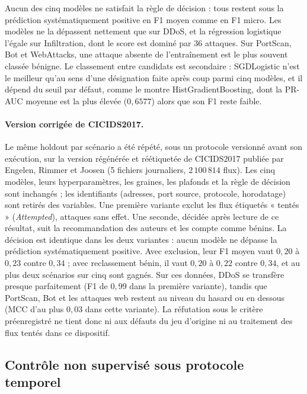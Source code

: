 Aucun des cinq modèles ne satisfait la règle de décision : tous restent sous la prédiction systématiquement positive en F1 moyen comme en F1 micro. Les modèles ne la dépassent nettement que sur DDoS, et la régression logistique l'égale sur Infiltration, dont le score est dominé par 36 attaques. Sur PortScan, Bot et WebAttacks, une attaque absente de l'entraînement est le plus souvent classée bénigne. Le classement entre candidats est secondaire : SGDLogistic n'est le meilleur qu'au sens d'une désignation faite après coup parmi cinq modèles, et il dépend du seuil par défaut, comme le montre HistGradientBoosting, dont la PR-AUC moyenne est la plus élevée ($0{,}6577$) alors que son F1 reste faible.

\paragraph{Version corrigée de CICIDS2017.}\label{sec:cicids-wtmc} Le même holdout par scénario a été répété, sous un protocole versionné avant son exécution, sur la version régénérée et réétiquetée de CICIDS2017 publiée par Engelen, Rimmer et Joosen (5 fichiers journaliers, $2\,100\,814$ flux). Les cinq modèles, leurs hyperparamètres, les graines, les plafonds et la règle de décision sont inchangés ; les identifiants (adresses, port source, protocole, horodatage) sont retirés des variables. Une première variante exclut les flux étiquetés « tentés » (\textit{Attempted}), attaques sans effet. Une seconde, décidée après lecture de ce résultat, suit la recommandation des auteurs et les compte comme bénins. La décision est identique dans les deux variantes : aucun modèle ne dépasse la prédiction systématiquement positive. Avec exclusion, leur F1 moyen vaut $0{,}20$ à $0{,}23$ contre $0{,}34$ ; avec reclassement bénin, il vaut $0{,}20$ à $0{,}22$ contre $0{,}34$, et au plus deux scénarios sur cinq sont gagnés. Sur ces données, DDoS se transfère presque parfaitement (F1 de $0{,}99$ dans la première variante), tandis que PortScan, Bot et les attaques web restent au niveau du hasard ou en dessous (MCC d'au plus $0{,}03$ dans cette variante). La réfutation sous le critère préenregistré ne tient donc ni aux défauts du jeu d'origine ni au traitement des flux tentés dans ce dispositif.

\subsection{Contrôle non supervisé sous protocole temporel}

